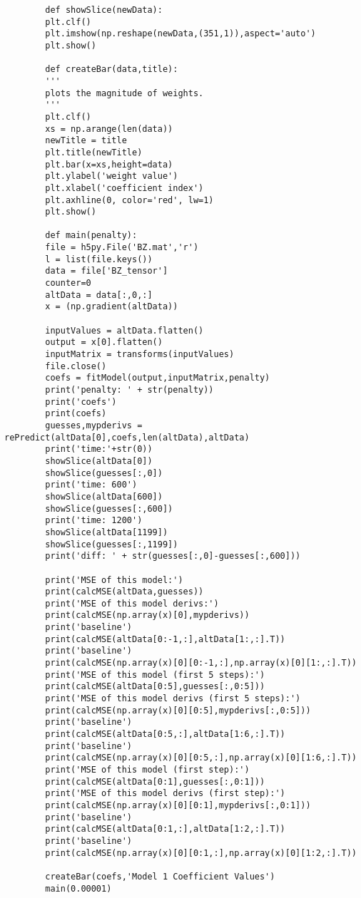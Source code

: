 \documentclass[12pt]{article}
\begin{document}
\begin{verbatim}
		def showSlice(newData):
		plt.clf()
		plt.imshow(np.reshape(newData,(351,1)),aspect='auto')
		plt.show()
		
		def createBar(data,title):
		'''
		plots the magnitude of weights.
		'''
		plt.clf()
		xs = np.arange(len(data))
		newTitle = title
		plt.title(newTitle)
		plt.bar(x=xs,height=data)
		plt.ylabel('weight value')
		plt.xlabel('coefficient index')
		plt.axhline(0, color='red', lw=1)
		plt.show()
		
		def main(penalty):
		file = h5py.File('BZ.mat','r')
		l = list(file.keys())
		data = file['BZ_tensor']
		counter=0
		altData = data[:,0,:]
		x = (np.gradient(altData))
		
		inputValues = altData.flatten()
		output = x[0].flatten()
		inputMatrix = transforms(inputValues)
		file.close()
		coefs = fitModel(output,inputMatrix,penalty)
		print('penalty: ' + str(penalty))
		print('coefs')
		print(coefs)
		guesses,mypderivs = rePredict(altData[0],coefs,len(altData),altData)
		print('time:'+str(0))
		showSlice(altData[0])
		showSlice(guesses[:,0])
		print('time: 600')
		showSlice(altData[600])
		showSlice(guesses[:,600])
		print('time: 1200')
		showSlice(altData[1199])
		showSlice(guesses[:,1199])
		print('diff: ' + str(guesses[:,0]-guesses[:,600]))
		
		print('MSE of this model:')
		print(calcMSE(altData,guesses))
		print('MSE of this model derivs:')
		print(calcMSE(np.array(x)[0],mypderivs))
		print('baseline')
		print(calcMSE(altData[0:-1,:],altData[1:,:].T))
		print('baseline')
		print(calcMSE(np.array(x)[0][0:-1,:],np.array(x)[0][1:,:].T))
		print('MSE of this model (first 5 steps):')
		print(calcMSE(altData[0:5],guesses[:,0:5]))
		print('MSE of this model derivs (first 5 steps):')
		print(calcMSE(np.array(x)[0][0:5],mypderivs[:,0:5]))
		print('baseline')
		print(calcMSE(altData[0:5,:],altData[1:6,:].T))
		print('baseline')
		print(calcMSE(np.array(x)[0][0:5,:],np.array(x)[0][1:6,:].T))
		print('MSE of this model (first step):')
		print(calcMSE(altData[0:1],guesses[:,0:1]))
		print('MSE of this model derivs (first step):')
		print(calcMSE(np.array(x)[0][0:1],mypderivs[:,0:1]))
		print('baseline')
		print(calcMSE(altData[0:1,:],altData[1:2,:].T))
		print('baseline')
		print(calcMSE(np.array(x)[0][0:1,:],np.array(x)[0][1:2,:].T))
		
		createBar(coefs,'Model 1 Coefficient Values')
		main(0.00001)
	\end{verbatim}
\end{document}
